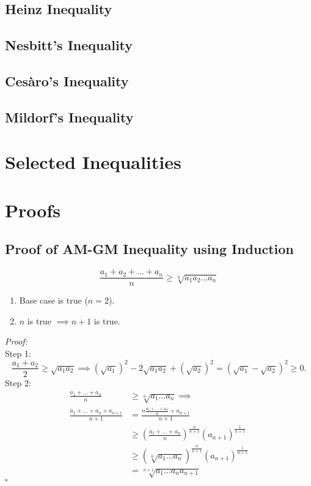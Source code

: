 \documentclass[a4paper,11pt]{article}
\begin{document}
\subsection{Heinz Inequality}
\subsection{Nesbitt's Inequality}
\subsection{Cesàro's Inequality}
\subsection{Mildorf's Inequality}


\section{Selected Inequalities}
\section{Proofs}
\subsection{Proof of AM-GM Inequality using Induction}
\begin{tcolorbox}[breakable]
    \[
    \frac{a_1 + a_2 + \dots + a_n}{n} \geq \sqrt[n]{a_1 a_2 \dots a_n}
    \]
    \begin{enumerate}[label=\roman*.]
        \item Base case is true ($n=2$).
        \item $n$ is true $\implies n+1$ is true.
    \end{enumerate}
    \emph{Proof:} \\[6pt]
    Step 1:
    \[
    \frac{a_1 + a_2}{2} \geq \sqrt{a_1 a_2} \implies (\sqrt{a_1})^2 - 2\sqrt{a_1 a_2} + (\sqrt{a_2})^2 = (\sqrt{a_1} - \sqrt{a_2})^2 \geq 0.
    \]
    Step 2:
    \begin{align*}
        \frac{a_1 + \dots + a_n}{n} &\geq \sqrt[n]{a_1 \dots a_n} \implies\\
        \frac{a_1 + \dots + a_n + a_{n+1}}{n+1} &= \frac{ n \frac{a_1 + \dots + a_n}{n} + a_{n+1}}{n+1} \\  &\geq \left( \frac{a_1 + \dots + a_n}{n} \right)^{\frac{n}{n+1}} (a_{n+1})^{\frac{1}{n+1}} \\
        &\geq \left( \sqrt[n]{a_1 \dots a_n} \right)^{\frac{n}{n+1}} (a_{n+1})^{\frac{1}{n+1}} \\
        &= \sqrt[n+1]{a_1 \dots a_n a_{n+1}} 
    \end{align*}
    \hfill$\square$
\end{tcolorbox}
\end{document}
